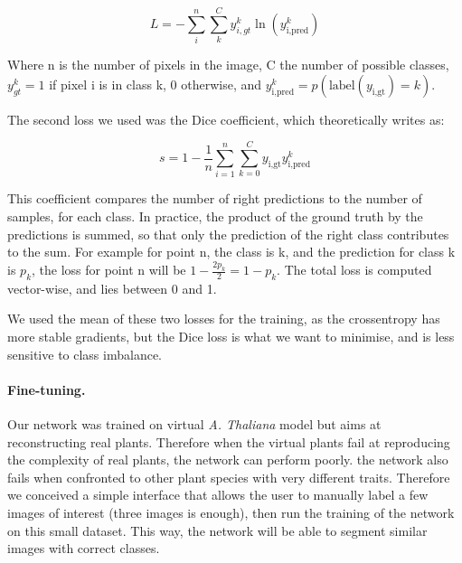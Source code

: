 \begin{equation}
    L =-\sum_i^n\sum_k^C{y^k_{i, gt}\ln(y_{\textrm{i},
    \textrm{pred}}^k)}
\end{equation}

Where n is the number of pixels in the image, C the number of possible
classes, $y_{gt}^k = 1$ if pixel i is in class k, 0 otherwise, and
$y_ {\textrm{i}, \textrm{pred}}^k = p(\textrm{label}(y_{\textrm{i},
\textrm{gt}}) = k)$.

The second loss we used was the Dice coefficient, which theoretically
writes as:

\begin{equation}
    s = 1 - \frac{1}{n}\sum_{i=1}^n\sum_{k=0}^{C}y_{\textrm{i},
    \textrm{gt}} y_{\textrm{i}, \textrm{pred}}^k
\end{equation}


This coefficient compares the number of right predictions to the
number of samples, for each class. In practice, the product of the
ground truth by the predictions is summed, so that only the prediction
of the right class contributes to the sum. For example for point n,
the class is k, and the prediction for class k is $p_k$, the loss
for point n will be $1 - \frac{2p_k}{2} = 1 - p_k$. The total loss
is computed vector-wise, and lies between 0 and 1.


We used the mean of these two losses for the training, as the
crossentropy has more stable gradients, but the Dice loss is what we
want to minimise, and is less sensitive to class imbalance.


\paragraph{Fine-tuning.} Our network was trained on virtual \emph{A.
Thaliana} model but aims at reconstructing real plants. Therefore when
the virtual plants fail at reproducing the complexity of real plants,
the network can perform poorly. the network also fails when confronted
to other plant species with very different traits. Therefore we
conceived a simple interface that allows the user to manually label a
few images of interest (three images is enough), then run the training
of the network on this small dataset. This way, the network will be
able to segment similar images with correct classes.


